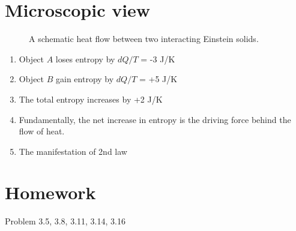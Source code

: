 \documentclass[twoside]{article}
\begin{document}
\section{Microscopic view}
\begin{figure}[h]
\centering
{}
\caption{A schematic heat flow between two interacting Einstein solids.}
\end{figure}
\begin{enumerate}
\item Object $A$ loses entropy by $dQ/T$ = -3 J/K 
\item Object $B$ gain  entropy by $dQ/T$ = +5 J/K 
\item The total entropy increases by +2 J/K
\item Fundamentally, the net increase in entropy is the driving force behind the flow of heat.
\item The manifestation of 2nd law
\end{enumerate}

\section{Homework}
Problem 3.5, 3.8, 3.11, 3.14, 3.16
\end{document}
